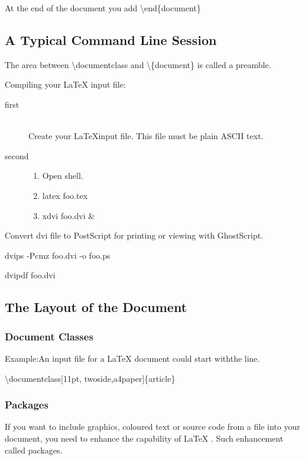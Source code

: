 \documentclass[11pt]{article}
\begin{document}
At the end of the document you add \textbackslash end\{document\}

\subsection{A Typical Command Line Session}
The area between \textbackslash documentclass and \textbackslash\{document\} is called a preamble.

Compiling your \LaTeX{} input file:

\begin{description}
	\item[first] \hfill \\ Create your \LaTeX input file. This file must be plain ASCII text.
	\item[second] \hfill  
		\begin{enumerate}
		\item
		Open shell.
	\item
		latex foo.tex
	\item
		xdvi foo.dvi \&
\end{enumerate}
\end{description}
Convert dvi file to PostScript for printing or viewing with GhostScript.
		
dvips -Pcmz foo.dvi -o foo.ps

dvipdf foo.dvi

\subsection{The Layout of the Document}
\subsubsection{Document Classes}
Example:An input file for a \LaTeX{} document could start with\linebreak[3]\break \sloppy the line.

\textbackslash documentclass[11pt, twoside,a4paper]\{article\}

\subsubsection{Packages}
If you want to include graphics, coloured text or source code from a file into your document, you need to enhance the capability of \LaTeX
. Such enhancement called packages.
\end{document}
